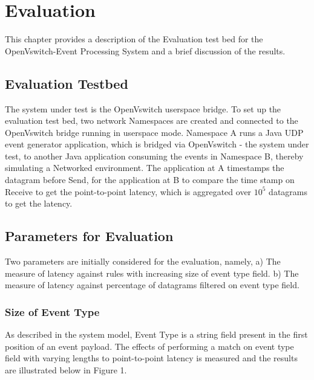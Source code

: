 \chapter{Evaluation}
This chapter provides a description of the Evaluation test bed for the OpenVswitch-Event Processing System and a brief discussion of the results.

\section{Evaluation Testbed}
The system under test is the OpenVswitch userspace bridge. To set up the evaluation test bed, two network Namespaces are created and connected to the OpenVswitch bridge running in userspace mode. Namespace A runs a Java UDP event generator application, which is bridged via OpenVswitch - the system under test, to another Java application consuming the events in Namespace B, thereby simulating a Networked environment. The application at A timestamps the datagram before Send, for the application at B to compare the time stamp on Receive to get the point-to-point latency, which is aggregated over ${10^5}$ datagrams to get the latency.

\section{Parameters for Evaluation}
Two parameters are initially considered for the evaluation, namely, a) The measure of latency against rules with increasing size of event type field. b) The measure of latency against percentage of datagrams filtered on event type field.
\subsection{Size of Event Type}
As described in the system model, Event Type is a string field present in the first position of an event payload. The effects of performing a match on event type field with varying lengths to point-to-point latency is measured and the results are illustrated below in Figure 1.\newline
{}
 

